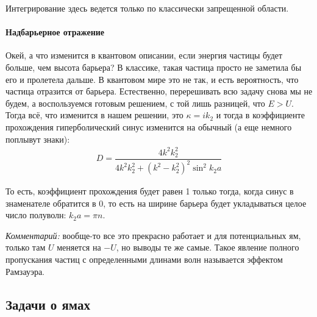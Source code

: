 \documentclass[12pt]{article}
\begin{document}
Интегрирование здесь ведется только по классически запрещенной области.

\paragraph{Надбарьерное отражение}
Окей, а что изменится в квантовом описании, если энергия частицы будет больше, чем высота барьера? В классике, такая частица просто не заметила бы его и пролетела дальше. В квантовом мире это не так, и есть вероятность, что частица отразится от барьера. Естественно, перерешивать всю задачу снова мы не будем, а воспользуемся готовым решением, с той лишь разницей, что $E>U$. Тогда  всё, что изменится в нашем решении, это $\kappa = ik_2$ и тогда в коэффициенте прохождения гиперболический синус изменится на обычный (а еще немного поплывут знаки):
\begin{gather*}
        D =  \dfrac{4k^2k_2^2}{4k^2k_2^2 + (k^2-k_2^2)^2 \sin^2{k_2 a}}
\end{gather*}

То есть, коэффициент прохождения будет равен 1 только тогда, когда синус в знаменателе обратится в 0, то есть на ширине барьера будет укладываться целое число полуволн: $k_2 a = \pi n$.

\textit{Комментарий:} вообще-то все это прекрасно работает и для потенциальных ям, только там $U$ меняется на $-U$, но выводы те же самые. Такое явление полного пропускания частиц с определенными длинами волн называется эффектом Рамзауэра.

\subsection{Задачи о ямах}
\end{document}
